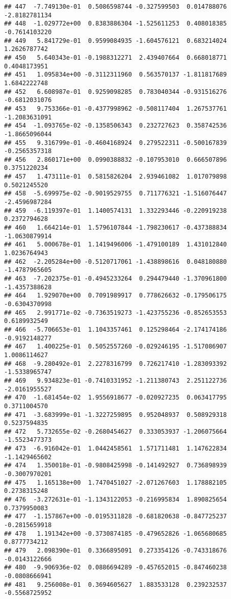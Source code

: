 \documentclass[
]{article}
\begin{document}
\begin{verbatim}
## 447  -7.749130e-01  0.5086598744 -0.327599503  0.014788076 -2.8182781134
## 448  -1.029772e+00  0.8383886304 -1.525611253  0.408018385 -0.7614103220
## 449   5.841729e-01  0.9599084935 -1.604576121  0.683214024  1.2626787742
## 450   5.640343e-01 -0.1988312271  2.439407664  0.668018771  0.4048173951
## 451   1.095834e+00 -0.3112311960  0.563570137 -1.811817689  1.6842222748
## 452   6.608987e-01  0.9259098285  0.783040344 -0.931516276 -0.6812031076
## 453   9.753366e-01 -0.4377998962 -0.508117404  1.267537761 -1.2083631091
## 454  -1.093765e-02 -0.1358506343  0.232727623  0.358742536 -1.8665096044
## 455   9.316799e-01 -0.4604168924  0.279522311 -0.500167839 -0.2565357318
## 456   2.860171e+00  0.0990388832 -0.107953010  0.666507896  0.3751220234
## 457   1.473111e-01  0.5815826204  2.939461082  1.017079898  0.5021245520
## 458  -5.699975e-02 -0.9019529755  0.711776321 -1.516076447 -2.4596987284
## 459  -6.119397e-01  1.1400574131  1.332293446 -0.220919238  0.2372794628
## 460   1.664214e-01  1.5796107844 -1.798230617 -0.437388834 -1.0630879914
## 461   5.000678e-01  1.1419496006 -1.479100189  1.431012840  1.0236764943
## 462  -2.205284e+00 -0.5120717061 -1.438898616  0.048180880 -1.4787965605
## 463  -7.202375e-01 -0.4945233264  0.294479440 -1.370961800 -1.4357388628
## 464   1.929070e+00  0.7091989917  0.778626632 -0.179506175 -0.6304370998
## 465   2.991771e-02 -0.7363519273 -1.423755236 -0.852653553  0.6189932549
## 466  -5.706653e-01  1.1043357461  0.125298464 -2.174174186 -0.9192148277
## 467   1.400225e-01  0.5052557260 -0.029246195 -1.517086907  1.0086114627
## 468  -9.280492e-01  2.2278316799  0.726217410 -1.283093392 -1.5338965747
## 469   9.934823e-01 -0.7410331952 -1.211380743  2.251122736 -2.0161955527
## 470  -1.681454e-02  1.9556918677 -0.020927235  0.063417795  0.3711004570
## 471  -3.683999e-01 -1.3227259895  0.952048937  0.508929318  0.5237594835
## 472   5.732655e-02 -0.2680454627  0.333053937 -1.206075664 -1.5523477373
## 473  -6.916042e-01  1.0442458561  1.571711481  1.147622834 -1.1429465602
## 474   1.350018e-01 -0.9808425998 -0.141492927  0.736898939 -0.3007970201
## 475   1.165138e+00  1.7470451027 -2.071267603  1.178882105  0.2738315248
## 476  -3.272631e-01 -1.1343122053 -0.216995834  1.890825654  0.7379950083
## 477  -1.157867e+00 -0.0195311828 -0.681820638 -0.847725237 -0.2815659918
## 478   1.191342e+00 -0.3730874185 -0.479652826 -1.065680685  0.8777734212
## 479   2.098390e-01  0.3366895091  0.273354126 -0.743318676 -0.0143122666
## 480  -9.906936e-02  0.0886694289 -0.457652015 -0.847460238 -0.0808666941
## 481   9.256008e-01  0.3694605627  1.883533128  0.239232537 -0.5568725952

\end{verbatim}
\end{document}
